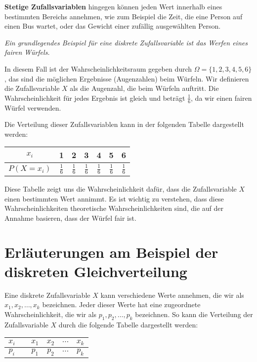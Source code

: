\textbf{Stetige Zufallsvariablen} hingegen können jeden Wert innerhalb eines bestimmten Bereichs annehmen, wie zum Beispiel die Zeit, die eine Person auf einen Bus wartet, oder das Gewicht einer zufällig ausgewählten Person.

\textit{Ein grundlegendes Beispiel für eine diskrete Zufallsvariable ist das Werfen eines fairen Würfels.}

In diesem Fall ist der Wahrscheinlichkeitsraum gegeben durch $\Omega = \{1, 2, 3, 4, 5, 6\}$, das sind die möglichen Ergebnisse (Augenzahlen) beim Würfeln. Wir definieren die Zufallsvariable $X$ als die Augenzahl, die beim Würfeln auftritt. Die Wahrscheinlichkeit für jedes Ergebnis ist gleich und beträgt $\frac{1}{6}$, da wir einen fairen Würfel verwenden.

Die Verteilung dieser Zufallsvariablen kann in der folgenden Tabelle dargestellt werden:

\begin{center}
    \begin{tabular}{c|c|c|c|c|c|c}
        $x_i$        & 1             & 2             & 3             & 4             & 5             & 6             \\
        \hline
        $P(X = x_i)$ & $\frac{1}{6}$ & $\frac{1}{6}$ & $\frac{1}{6}$ & $\frac{1}{6}$ & $\frac{1}{6}$ & $\frac{1}{6}$ \\
    \end{tabular}
\end{center}

Diese Tabelle zeigt uns die Wahrscheinlichkeit dafür, dass die Zufallsvariable $X$ einen bestimmten Wert annimmt.
Es ist wichtig zu verstehen, dass diese Wahrscheinlichkeiten theoretische Wahrscheinlichkeiten sind, die auf der Annahme basieren, dass der Würfel fair ist.


\section{Erläuterungen am Beispiel der diskreten Gleichverteilung}

Eine diskrete Zufallsvariable $X$ kann verschiedene Werte annehmen, die wir als $x_1, x_2, \dots, x_k$ bezeichnen.
Jeder dieser Werte hat eine zugeordnete Wahrscheinlichkeit, die wir als $p_1, p_2, \dots, p_k$ bezeichnen.
So kann die Verteilung der Zufallsvariable $X$ durch die folgende Tabelle dargestellt werden:

\begin{center}
    \begin{tabular}{|c|c|c|c|c|c|}
        \hline
        $x_i$ & & $x_1$ & $x_2$ & $\cdots$ & $x_k$ \\
        \hline
        $p_i$ & & $p_1$ & $p_2$ & $\cdots$ & $p_k$ \\
        \hline
    \end{tabular}
\end{center}

